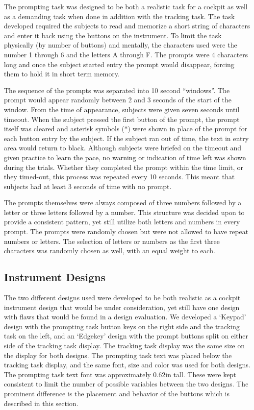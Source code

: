 The prompting task was designed to be both a realistic task for a cockpit as well as a demanding task when done in addition with the tracking task.
The task developed required the subjects to read and memorize a short string of characters and enter it back using the buttons on the instrument.
To limit the task physically (by number of buttons) and mentally, the characters used were the number 1 through 6 and the letters A through F.
The prompts were 4 characters long and once the subject started entry the prompt would disappear, forcing them to hold it in short term memory.

The sequence of the prompts was separated into 10 second ``windows''.
The prompt would appear randomly between 2 and 3 seconds of the start of the window.
From the time of appearance, subjects were given seven seconds until timeout.
When the subject pressed the first button of the prompt, the prompt itself was cleared and asterisk symbols ($*$) were shown in place of the prompt for each button entry by the subject.
If the subject ran out of time, the text in entry area would return to black.
Although subjects were briefed on the timeout and given practice to learn the pace, no warning or indication of time left was shown during the trials.
Whether they completed the prompt within the time limit, or they timed-out, this process was repeated every 10 seconds.
This meant that subjects had at least 3 seconds of time with no prompt.

The prompts themselves were always composed of three numbers followed by a letter or three letters followed by a number.
This structure was decided upon to provide a consistent pattern, yet still utilize both letters and numbers in every prompt.
The prompts were randomly chosen but were not allowed to have repeat numbers or letters. %
The selection of letters or numbers as the first three characters was randomly chosen as well, with an equal weight to each.

\subsection{Instrument Designs}

The two different designs used were developed to be both realistic as a cockpit instrument design that would be under consideration, yet still have one design with flaws that would be found in a design evaluation.
We developed a `Keypad' design with the prompting task button keys on the right side and the tracking task on the left, and an `Edgekey' design with the prompt buttons split on either side of the tracking task display.
The tracking task display was the same size on the display for both designs.
The prompting task text was placed below the tracking task display, and the same font, size and color was used for both designs.
The prompting task text font was approximately 0.62in tall.
These were kept consistent to limit the number of possible variables between the two designs.
The prominent difference is the placement and behavior of the buttons which is described in this section.

